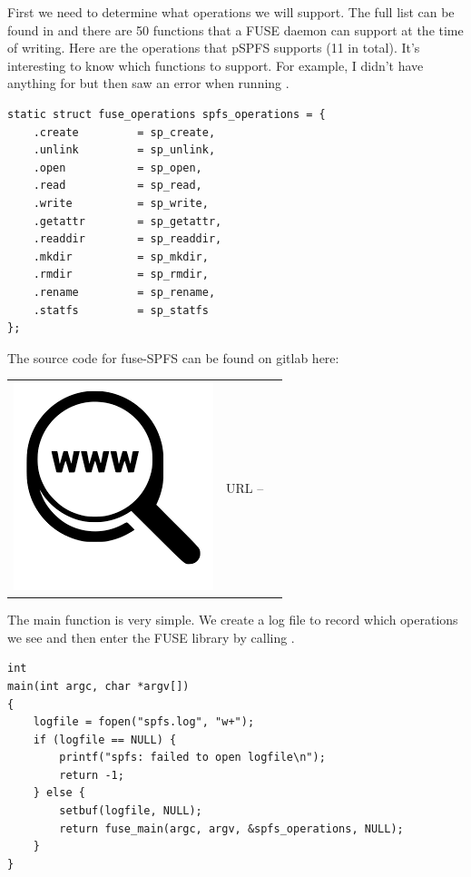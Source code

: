 First we need to determine what operations we will support. The full list can be found in  and there are 50 functions that a FUSE daemon can support at the time of writing. Here are the operations that pSPFS supports (11 in total). It's interesting to know which functions to support. For example, I didn't have anything for  but then saw an error when running .

\begin{lstlisting}
static struct fuse_operations spfs_operations = {
    .create         = sp_create,
    .unlink         = sp_unlink,
    .open           = sp_open,
    .read           = sp_read,
    .write          = sp_write,
    .getattr        = sp_getattr,
    .readdir        = sp_readdir,
    .mkdir          = sp_mkdir,
    .rmdir          = sp_rmdir,
    .rename         = sp_rename,
    .statfs         = sp_statfs
};
\end{lstlisting}

\noindent
The source code for fuse-SPFS can be found on gitlab here:

\begin{table}[h]
\begin{tabular}{lcl}
\parbox[r]{0.5in}{\includegraphics[scale=0.15]{figures/url.png}} & \parbox[l]{0.55in}{URL  -- } & \parbox[l]{3in}{}
\end{tabular}
\end{table}

\noindent
The main function is very simple. We create a log file to record which operations we see and then enter the FUSE library by calling .

\begin{lstlisting}             
int
main(int argc, char *argv[])
{
    logfile = fopen("spfs.log", "w+");
    if (logfile == NULL) {
        printf("spfs: failed to open logfile\n");
        return -1;
    } else {
        setbuf(logfile, NULL);
        return fuse_main(argc, argv, &spfs_operations, NULL);
    }
}
\end{lstlisting}

